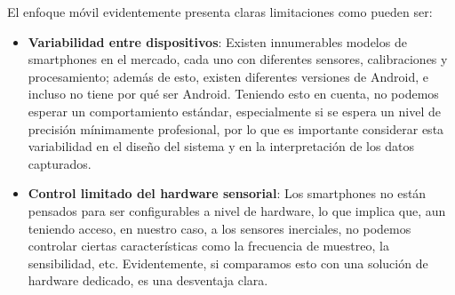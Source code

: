 El enfoque móvil evidentemente presenta claras limitaciones como pueden ser: 
\begin{itemize}
  \item \textbf{Variabilidad entre dispositivos}: Existen innumerables modelos de smartphones en el mercado, cada uno con diferentes sensores, calibraciones y procesamiento; además de esto, existen diferentes versiones de Android, e incluso no tiene por qué ser Android. Teniendo esto en cuenta, no podemos esperar un comportamiento estándar, especialmente si se espera un nivel de precisión mínimamente profesional, por lo que es importante considerar esta variabilidad en el diseño del sistema y en la interpretación de los datos capturados. 
  \item \textbf{Control limitado del hardware sensorial}: Los smartphones no están pensados para ser configurables a nivel de hardware, lo que implica que, aun teniendo acceso, en nuestro caso, a los sensores inerciales, no podemos controlar ciertas características como la frecuencia de muestreo, la sensibilidad, etc. Evidentemente, si comparamos esto con una solución de hardware dedicado, es una desventaja clara. 
\end{itemize}

